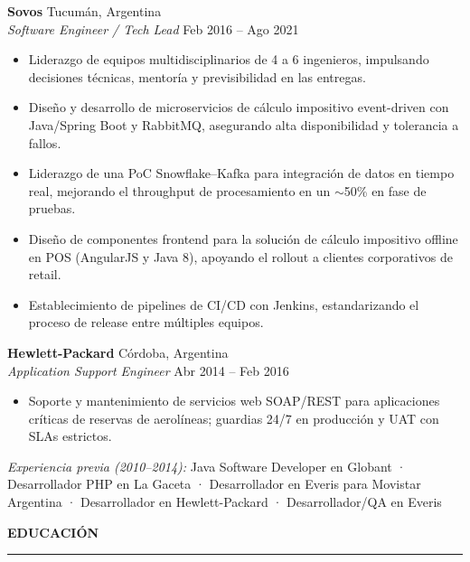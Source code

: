 \documentclass[11pt]{article}
\newcommand{\jobsep}{\vspace{8pt}}
\begin{document}
\jobsep


\textbf{Sovos} \hfill Tucumán, Argentina\\
\textit{Software Engineer / Tech Lead} \hfill Feb 2016 -- Ago 2021

\begin{itemize}
    \item Liderazgo de equipos multidisciplinarios de 4 a 6 ingenieros, impulsando decisiones técnicas, mentoría y previsibilidad en las entregas.
    \item Diseño y desarrollo de microservicios de cálculo impositivo event-driven con Java/Spring Boot y RabbitMQ, asegurando alta disponibilidad y tolerancia a fallos.
    \item Liderazgo de una PoC Snowflake--Kafka para integración de datos en tiempo real, mejorando el throughput de procesamiento en un $\sim$50\% en fase de pruebas.
    \item Diseño de componentes frontend para la solución de cálculo impositivo offline en POS (AngularJS y Java 8), apoyando el rollout a clientes corporativos de retail.
    \item Establecimiento de pipelines de CI/CD con Jenkins, estandarizando el proceso de release entre múltiples equipos.
\end{itemize}

\jobsep

\textbf{Hewlett-Packard} \hfill Córdoba, Argentina\\
\textit{Application Support Engineer} \hfill Abr 2014 -- Feb 2016

\begin{itemize}
    \item Soporte y mantenimiento de servicios web SOAP/REST para aplicaciones críticas de reservas de aerolíneas; guardias 24/7 en producción y UAT con SLAs estrictos.
\end{itemize}

\jobsep

\textit{Experiencia previa (2010--2014):} Java Software Developer en Globant · Desarrollador PHP en La Gaceta · Desarrollador en Everis para Movistar Argentina · Desarrollador en Hewlett-Packard · Desarrollador/QA en Everis

\vspace{20pt}

{\large \textbf{EDUCACIÓN}}\\[3pt]
\hrule
\vspace{3pt}
\end{document}
